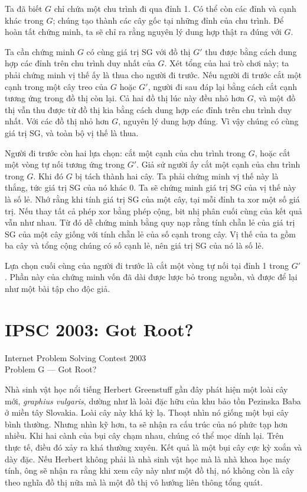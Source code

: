 \documentclass[11pt]{article}
\begin{document}
Ta đã biết \(G\) chỉ chứa một chu trình đi qua đỉnh 1. Có thể còn các đỉnh và
cạnh khác trong \(G\); chúng tạo thành các cây gốc tại những đỉnh của chu trình.
Để hoàn tất chứng minh, ta sẽ chỉ ra rằng nguyên lý dung hợp thật ra đúng với
\(G\).

Ta cần chứng minh \(G\) có cùng giá trị SG với đồ thị \(G'\) thu được bằng cách
dung hợp các đỉnh trên chu trình duy nhất của \(G\). Xét tổng của hai trò chơi
này; ta phải chứng minh vị thế ấy là thua cho người đi trước. Nếu người đi
trước cắt một cạnh trong một cây treo của \(G\) hoặc \(G'\), người đi sau đáp
lại bằng cách cắt cạnh tương ứng trong đồ thị còn lại. Cả hai đồ thị lúc này
đều nhỏ hơn \(G\), và một đồ thị vẫn thu được từ đồ thị kia bằng cách dung hợp
các đỉnh trên chu trình duy nhất. Với các đồ thị nhỏ hơn \(G\), nguyên lý dung
hợp đúng. Vì vậy chúng có cùng giá trị SG, và toàn bộ vị thế là thua.

Người đi trước còn hai lựa chọn: cắt một cạnh của chu trình trong \(G\), hoặc
cắt một vòng tự nối tương ứng trong \(G'\). Giả sử người ấy cắt một cạnh của
chu trình trong \(G\). Khi đó \(G\) bị tách thành hai cây. Ta phải chứng minh
vị thế này là thắng, tức giá trị SG của nó khác 0. Ta sẽ chứng minh giá trị SG
của vị thế này là số lẻ. Nhớ rằng khi tính giá trị SG của một cây, tại mỗi đỉnh
ta xor một số giá trị. Nếu thay tất cả phép xor bằng phép cộng, bit nhị phân
cuối cùng của kết quả vẫn như nhau. Từ đó dễ chứng minh bằng quy nạp rằng tính
chẵn lẻ của giá trị SG của một cây giống với tính chẵn lẻ của số cạnh trong
cây. Vị thế của ta gồm ba cây và tổng cộng chúng có số cạnh lẻ, nên giá trị SG
của nó là số lẻ.

Lựa chọn cuối cùng của người đi trước là cắt một vòng tự nối tại đỉnh 1 trong
\(G'\). Phần này của chứng minh vốn đã dài được lược bỏ trong nguồn, và được
để lại như một bài tập cho độc giả.

\section{IPSC 2003: Got Root?}

\begin{center}
Internet Problem Solving Contest 2003\\
Problem G --- Got Root?
\end{center}

Nhà sinh vật học nổi tiếng Herbert Greenstuff gần đây phát hiện một loài cây
mới, \emph{graphius vulgaris}, dường như là loài đặc hữu của khu bảo tồn
Pezinska Baba ở miền tây Slovakia. Loài cây này khá kỳ lạ. Thoạt nhìn nó giống
một bụi cây bình thường. Nhưng nhìn kỹ hơn, ta sẽ nhận ra cấu trúc của nó phức
tạp hơn nhiều. Khi hai cành của bụi cây chạm nhau, chúng có thể mọc dính lại.
Trên thực tế, điều đó xảy ra khá thường xuyên. Kết quả là một bụi cây cực kỳ
xoắn và dày đặc. Nếu Herbert không phải là nhà sinh vật học mà là nhà khoa học
máy tính, ông sẽ nhận ra rằng khi xem cây này như một đồ thị, nó không còn là
cây theo nghĩa đồ thị nữa mà là một đồ thị vô hướng liên thông tổng quát.
\end{document}
